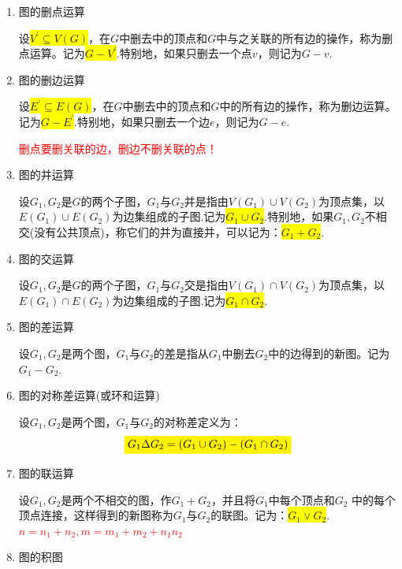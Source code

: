 \begin{enumerate}
\item 图的删点运算
	
设\colorbox{yellow}{$V^{'}\subseteq V(G)$}，在$G$中删去中的顶点和$G$中与之关联的所有边的操作，称为删点运算。记为\colorbox{yellow}{$G-V^{'}$}.特别地，如果只删去一个点$v$，则记为$G-v$.

\item 图的删边运算
	
设\colorbox{yellow}{$E^{'}\subseteq E(G)$}，在$G$中删去中的顶点和$G$中的所有边的操作，称为删边运算。记为\colorbox{yellow}{$G-E^{'}$}.特别地，如果只删去一个边$e$，则记为$G-e$.
\begin{note}
 \textcolor{red}{删点要删关联的边，删边不删关联的点！}
\end{note}

\item 图的并运算

设$G_1,G_2$是$G$的两个子图，$G_1$与$G_2$并是指由$V(G_1)\cup  V(G_2)$为顶点集，以$E(G_1)\cup  E(G_2)$为边集组成的子图.记为\colorbox{yellow}{$G_1\cup G_2$}.特别地，如果$G_1,G_2$不相交(没有公共顶点)，称它们的并为直接并，可以记为：\colorbox{yellow}{$G_1+ G_2$}.

\item 图的交运算

设$G_1,G_2$是$G$的两个子图，$G_1$与$G_2$交是指由$V(G_1)\cap  V(G_2)$为顶点集，以$E(G_1)\cap  E(G_2)$为边集组成的子图.记为\colorbox{yellow}{$G_1\cap G_2$}.

\item 图的差运算

设$G_1,G_2$是两个图，$G_1$与$G_2$的差是指从$G_1$中删去$G_2$中的边得到的新图。记为$G_1-G_2$.

\item 图的对称差运算(或环和运算)

设$G_1,G_2$是两个图，$G_1$与$G_2$的对称差定义为：
\[
\colorbox{yellow}{$G_1\Delta G_2 = (G_1\cup G_2) - (G_1\cap G_2) $}
\]

\item 图的联运算

设$G_1,G_2$是两个不相交的图，作$G_1+G_2$，并且将$G_1$中每个顶点和$G_2$
中的每个顶点连接，这样得到的新图称为$G_1$与$G_2$的联图。记为：\colorbox{yellow}{$G_1\lor G_2 $}. \textcolor{red}{$n=n_1+n_2, m=m_1+m_2+n_1n_2$}

\item 图的积图


\end{enumerate}

